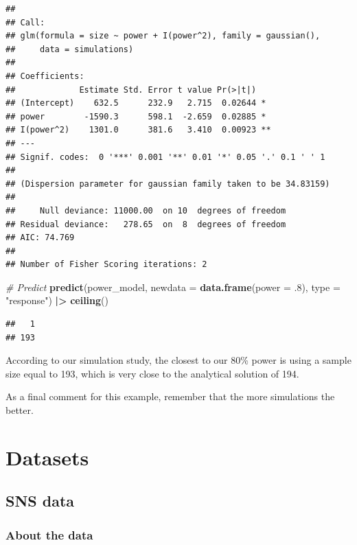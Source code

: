 \documentclass[
]{book}
\newenvironment{Shaded}{\begin{snugshade}}{\end{snugshade}}
\newcommand{\AttributeTok}[1]{\textcolor[rgb]{0.13,0.29,0.53}{#1}}
\newcommand{\CommentTok}[1]{\textcolor[rgb]{0.56,0.35,0.01}{\textit{#1}}}
\newcommand{\DecValTok}[1]{\textcolor[rgb]{0.00,0.00,0.81}{#1}}
\newcommand{\FunctionTok}[1]{\textcolor[rgb]{0.13,0.29,0.53}{\textbf{#1}}}
\newcommand{\NormalTok}[1]{#1}
\newcommand{\SpecialCharTok}[1]{\textcolor[rgb]{0.81,0.36,0.00}{\textbf{#1}}}
\newcommand{\StringTok}[1]{\textcolor[rgb]{0.31,0.60,0.02}{#1}}
\begin{document}
\begin{verbatim}
## 
## Call:
## glm(formula = size ~ power + I(power^2), family = gaussian(), 
##     data = simulations)
## 
## Coefficients:
##             Estimate Std. Error t value Pr(>|t|)   
## (Intercept)    632.5      232.9   2.715  0.02644 * 
## power        -1590.3      598.1  -2.659  0.02885 * 
## I(power^2)    1301.0      381.6   3.410  0.00923 **
## ---
## Signif. codes:  0 '***' 0.001 '**' 0.01 '*' 0.05 '.' 0.1 ' ' 1
## 
## (Dispersion parameter for gaussian family taken to be 34.83159)
## 
##     Null deviance: 11000.00  on 10  degrees of freedom
## Residual deviance:   278.65  on  8  degrees of freedom
## AIC: 74.769
## 
## Number of Fisher Scoring iterations: 2
\end{verbatim}

\begin{Shaded}
\begin{Highlighting}[]
\CommentTok{\# Predict}
\FunctionTok{predict}\NormalTok{(power\_model, }\AttributeTok{newdata =} \FunctionTok{data.frame}\NormalTok{(}\AttributeTok{power =}\NormalTok{ .}\DecValTok{8}\NormalTok{), }\AttributeTok{type =} \StringTok{"response"}\NormalTok{) }\SpecialCharTok{|\textgreater{}}
  \FunctionTok{ceiling}\NormalTok{()}
\end{Highlighting}
\end{Shaded}

\begin{verbatim}
##   1 
## 193
\end{verbatim}

According to our simulation study, the closest to our 80\% power is using a sample size equal to 193, which is very close to the analytical solution of 194.

As a final comment for this example, remember that the more simulations the better.

\cleardoublepage

\hypertarget{appendix-appendix}{%
\appendix}


\hypertarget{datasets-1}{%
\chapter{Datasets}\label{datasets-1}}

\hypertarget{sns-data}{%
\section{SNS data}\label{sns-data}}

\hypertarget{about-the-data}{%
\subsection{About the data}\label{about-the-data}}
\end{document}
